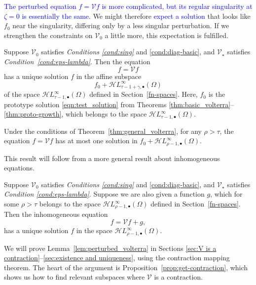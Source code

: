 \documentclass[review]{siamart220329}
\newcommand{\singexp}[2]{\mathcal{H}L^\infty_{#1, #2}}
\newcommand{\singexpalg}[1]{\singexp{#1}{\bullet}}
\newcommand{\volterra}{\mathcal{V}}
\newcommand{\hardpart}{\mathcal{V}_0}
\newcommand{\softpart}{\mathcal{V}_\star}
\newcommand{\solproto}{f_0}
\newcommand{\domain}{\Omega}
\begin{document}
\textcolor{blue}{The perturbed equation $f = \volterra f$ is more complicated, but its regular singularity at $\zeta = 0$ is essentially the same.} We might therefore \textcolor{blue}{expect a solution} that looks like $\solproto$ near the singularity, differing only by a less singular perturbation. If we strengthen the constraints on $\hardpart$ a little more, this expectation is fulfilled.
\begin{theorem}\label{thm:general_volterra}
Suppose $\hardpart$ satisfies {\em Conditions \eqref{cond:sing}} and \eqref{cond:diag-basic}, and $\softpart$ satisfies {\em Condition~\eqref{cond:eps-lambda}}. Then the equation
\[ f = \volterra f \]
has a unique solution $f$ in the affine subspace
\[ f_0 + \singexpalg{\tau-1+\gamma}(\Omega) \]
of the space $\singexpalg{\tau-1}(\Omega)$ defined in Section~\ref{fn-spaces}. Here, $f_0$ is the prototype solution \eqref{eqn:test_solution} from Theorems \ref{thm:basic_volterra}--\ref{thm:proto-growth}, which belongs to the space $\singexpalg{\tau-1}(\domain)$.
\end{theorem}
\color{blue}\begin{corollary}\label{cor:expand_uniq}
Under the conditions of Theorem~\ref{thm:general_volterra}, for any $\rho > \tau$, the equation $f = \volterra f$ has at most one solution in $f_0 + \singexpalg{\rho-1}(\Omega)$. 
\end{corollary}\color{black}
This result will follow from a more general result about inhomogeneous equations.
\begin{lemma}\label{lem:perturbed_volterra}
Suppose $\hardpart$ satisfies {\em Conditions \eqref{cond:sing}} and \eqref{cond:diag-basic}, and $\softpart$ satisfies {\em Condition \eqref{cond:eps-lambda}}. Suppose we are also given a function $g$, which for some $\rho > \tau$ belongs to the space $\singexpalg{\rho-1}(\Omega)$ defined in Section~\ref{fn-spaces}. Then the inhomogeneous equation
\[ f = \volterra f + g, \]
has a unique solution $f$ in the space $\singexpalg{\rho-1}(\Omega)$.
\end{lemma}
We will prove Lemma~\ref{lem:perturbed_volterra} in Sections \ref{sec:V is a contraction}--\ref{sec:existence and uniqueness}, using the contraction mapping theorem. The heart of the argument is Proposition~\ref{prop:get-contraction}, which shows us how to find relevant subspaces where $\volterra$ is a contraction.
\end{document}
